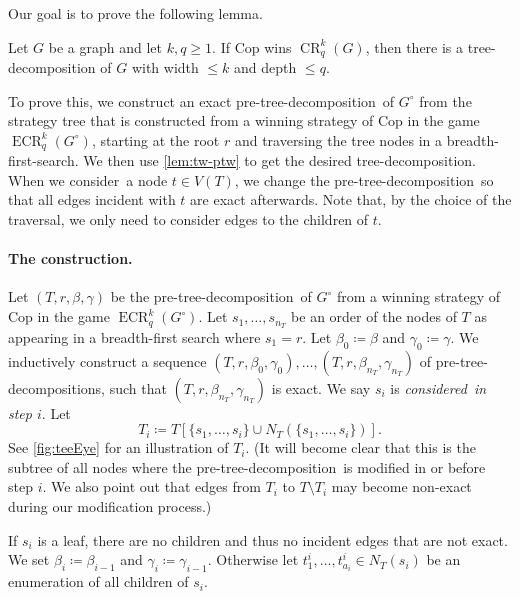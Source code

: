 \documentclass{lmcs}
\theoremstyle{plain}\newtheorem{claim}[thm]{Claim}   %
\DeclareMathOperator{\CR}{CR}
\newcommand{\CRkq}{\CR^k_q}
\DeclareMathOperator{\eCR}{ECR}
\newcommand{\eCRkq}{\eCR^k_q}
\newcommand{\preTreeDec}{pre-tree-decomposition}
\newcommand{\considered}{considered}
\newcommand{\consider}{consider}
\begin{document}
Our goal is to prove the following lemma.

\begin{lem}
	\label{lem:CRtoTD}
	Let $G$ be a graph and let $k,q\geq 1$. 
	If Cop wins $\CRkq(G)$, then there is a tree-decomposition of $G$ with width $\leq k$ and depth $\leq q$.
\end{lem}

To prove this, we construct an exact \preTreeDec\ of $G^\circ$ from the strategy tree that is constructed from a winning strategy of Cop in the game $\eCRkq(G^\circ)$, starting at the root $r$ and traversing the tree nodes in a breadth-first-search.
We then use \autoref{lem:tw-ptw} to get the desired tree-decomposition.
When we \consider\ a node $t \in V(T)$, 
we change the \preTreeDec\ so that all edges incident with $t$ are exact afterwards.
Note that, by the choice of the traversal, we only need to consider edges to the children of $t$.

\paragraph*{The construction.}
Let $(T,r,\beta,\gamma)$ be the \preTreeDec\ of $G^\circ$ from a winning strategy of Cop in the game $\eCRkq(G^\circ)$.
Let $s_1,\ldots,s_{n_T}$ be an order of the nodes of $T$ as appearing in a breadth-first search where $s_1=r$. Let $\beta_0\coloneqq\beta$ and $\gamma_0\coloneqq \gamma$.
We inductively construct a sequence $(T,r,\beta_0,\gamma_0), \ldots, (T,r,\beta_{n_T},\gamma_{n_T})$ of \preTreeDec s, such that $(T,r,\beta_{n_T},\gamma_{n_T})$ is exact.
We say $s_i$ is \emph{\considered\ in step $i$}.
Let \[T_i\coloneqq T[\{s_1,\ldots,s_i\}\cup N_T(\{s_1,\ldots,s_i\})].\]
See \autoref{fig:teeEye} for an illustration of $T_i$. (It will become clear that this is the subtree of all nodes where the \preTreeDec\ is modified in or before step $i$. We also point out that edges from $T_i$ to $T\setminus T_i$ may become non-exact during our modification process.)

If $s_i$ is a leaf, there are no children and thus no incident edges that are not exact.
We set $\beta_i\coloneqq\beta_{i-1}$ and $\gamma_i\coloneqq \gamma_{i-1}$.
Otherwise let $t^i_1,\ldots,t^i_{a_i}\in N_T(s_i)$ be an enumeration of all children of $s_i$.
\end{document}
